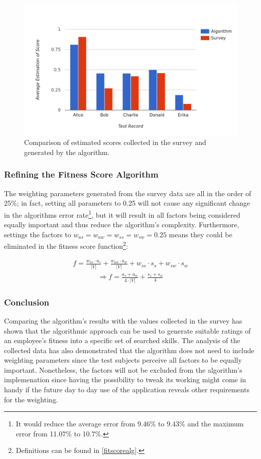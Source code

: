 \begin{figure}[H]
    \centering
    \includegraphics[width=\textwidth]{images/survey_vs_alg.png}
    \caption[Diagram: Comparison of Survey and Algorithm]{Comparison of estimated scores collected in the survey and generated by the algorithm.}
    \label{survey:compare}
\end{figure}

\subsubsection{Refining the Fitness Score Algorithm}
The weighting parameters generated from the survey data are all in the order of 25\%; in fact, setting all parameters to 0.25 will not cause any significant change in the algorithms error rate\footnote{It would reduce the average error from 9.46\% to 9.43\% and the maximum error from 11.07\% to 10.7\%.}, but it will result in all factors being considered equally important and thus reduce the algorithm's complexity.
Furthermore, settings the factors to $w_{as} = w_{aw} = w_{ss} = w_{sw} = 0.25$ means they could be eliminated in the fitness score function\footnote{Definitions can be found in \ref{fitscorealg}.}:

\begin{gather*}
  f = \frac{w_{as} \cdot a_s}{|V|} + \frac{w_{aw} \cdot a_w}{|V|} + w_{ss} \cdot s_s + w_{sw} \cdot s_w
\end{gather*}
\begin{gather*}
	\Rightarrow f = \frac{a_s + a_w}{4 \cdot |V|} + \frac{s_s + s_w}{4}
\end{gather*}

\subsubsection{Conclusion}
Comparing the algorithm's results with the values collected in the survey has shown that the algorithmic approach can be used to generate
suitable ratings of an employee's fitness into a specific set of searched skills. The analysis of the collected data has also demonstrated that the algorithm
does not need to include weighting parameters since the test subjects perceive all factors to be equally important. Nonetheless, the factors will not be excluded from the algorithm's implemenation since having the possibility to tweak its working might come in handy if the future day to day use of the application reveals other requirements for the weighting.


